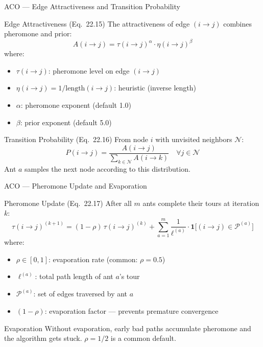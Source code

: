 \documentclass[aspectratio=169,10pt]{beamer}
\begin{document}
\begin{frame}{ACO --- Edge Attractiveness and Transition Probability}
  \begin{block}{Edge Attractiveness (Eq.\ 22.15)}
    The attractiveness of edge $(i \to j)$ combines pheromone and prior:
    \[
      A(i \to j) = \tau(i \to j)^\alpha \cdot \eta(i \to j)^\beta
    \]
    where:
    \begin{itemize}
      \item $\tau(i \to j)$: pheromone level on edge $(i \to j)$
      \item $\eta(i \to j) = 1/\text{length}(i \to j)$: heuristic (inverse length)
      \item $\alpha$: pheromone exponent (default 1.0)
      \item $\beta$: prior exponent (default 5.0)
    \end{itemize}
  \end{block}

  \begin{block}{Transition Probability (Eq.\ 22.16)}
    From node $i$ with unvisited neighbors $\mathcal{N}$:
    \[
      P(i \to j) = \frac{A(i \to j)}{\sum_{k \in \mathcal{N}} A(i \to k)}
      \quad \forall j \in \mathcal{N}
    \]
    Ant $a$ samples the next node according to this distribution.
  \end{block}
\end{frame}

\begin{frame}{ACO --- Pheromone Update and Evaporation}
  \begin{block}{Pheromone Update (Eq.\ 22.17)}
    After all $m$ ants complete their tours at iteration $k$:
    \[
      \tau(i \to j)^{(k+1)}
        = (1 - \rho)\,\tau(i \to j)^{(k)}
          + \sum_{a=1}^{m} \frac{1}{\ell^{(a)}}
            \cdot \mathbf{1}\!\bigl[(i \to j) \in \mathcal{P}^{(a)}\bigr]
    \]
    where:
    \begin{itemize}
      \item $\rho \in [0,1]$: evaporation rate (common: $\rho = 0.5$)
      \item $\ell^{(a)}$: total path length of ant $a$'s tour
      \item $\mathcal{P}^{(a)}$: set of edges traversed by ant $a$
      \item $(1-\rho)$: evaporation factor --- prevents premature convergence
    \end{itemize}
  \end{block}

  \begin{alertblock}{Evaporation}
    Without evaporation, early bad paths accumulate pheromone and the
    algorithm gets stuck.  $\rho = 1/2$ is a common default.
  \end{alertblock}
\end{frame}
\end{document}
